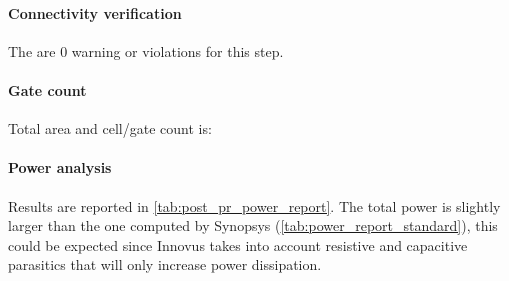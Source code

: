 \paragraph{Connectivity verification} The are 0 warning or violations for this step.


\paragraph{Gate count} Total area and cell/gate count is:


\paragraph{Power analysis} Results are reported in \autoref{tab:post_pr_power_report}. The total power is slightly larger than the one computed by Synopsys (\autoref{tab:power_report_standard}), this could be expected since Innovus takes into account resistive and capacitive parasitics that will only increase power dissipation.

